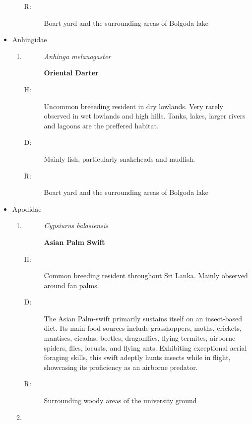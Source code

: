 \begin{itemize}
\begin{enumerate}
\begin{description}
\item[R: ]%
Boart yard and the surrounding areas of Bolgoda lake%
\end{description}%
\end{enumerate}%
\item%
Anhingidae%
\begin{enumerate}%
\item%
\begin{description}%
\item[]%
\textit{Anhinga melanogaster}%
\item[]%
\textbf{Oriental Darter}%
\end{description}%
\begin{description}%
\item[H: ]%
Uncommon breeeding resident in dry lowlands. Very rarely observed in wet lowlands and high hills. Tanks, lakes, larger rivers and lagoons are the preffered habitat.%
\item[D: ]%
Mainly fish, particularly snakeheads and mudfish.%
\item[R: ]%
Boart yard and the surrounding areas of Bolgoda lake%
\end{description}%
\end{enumerate}%
\item%
Apodidae%
\begin{enumerate}%
\item%
\begin{description}%
\item[]%
\textit{Cypsiurus balasiensis}%
\item[]%
\textbf{Asian Palm Swift}%
\end{description}%
\begin{description}%
\item[H: ]%
Common breeding resident throughout Sri Lanka. Mainly observed around fan palms.%
\item[D: ]%
The Asian Palm{-}swift primarily sustains itself on an insect{-}based diet. Its main food sources include grasshoppers, moths, crickets, mantises, cicadas, beetles, dragonflies, flying termites, airborne spiders, flies, locusts, and flying ants. Exhibiting exceptional aerial foraging skills, this swift adeptly hunts insects while in flight, showcasing its proficiency as an airborne predator.%
\item[R: ]%
Surrounding woody areas of the university ground%
\end{description}%
\item%
\begin{description}%

\end{description}
\end{enumerate}
\end{itemize}
